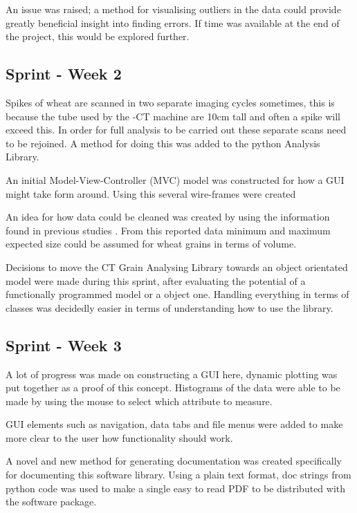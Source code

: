 \documentclass[11pt]{report}
\begin{document}
An issue was raised; a method for visualising outliers in the data could provide greatly beneficial insight into finding errors. If time was available at the end of the project, this would be explored further.

\subsection{Sprint - Week 2}
\label{sec:org50679cf}

Spikes of wheat are scanned in two separate imaging cycles sometimes, this is because the tube used by the \textmu{}-CT machine are 10cm tall and often a spike will exceed this. In order for full analysis to be carried out these separate scans need to be rejoined. A method for doing this was added to the python Analysis Library.

An initial Model-View-Controller (MVC) model was constructed for how a GUI might take form around. Using this several wire-frames were created

An idea for how data could be cleaned was created by using the information found in previous studies \cite{Hughes2017}. From this reported data minimum and maximum expected size could be assumed for wheat grains in terms of volume.

Decisions to move the CT Grain Analysing Library towards an object orientated model were made during this sprint, after evaluating the potential of a functionally programmed model or a object one. Handling everything in terms of classes was decidedly easier in terms of understanding how to use the library.

\subsection{Sprint - Week 3}
\label{sec:orgbc3bae6}

A lot of progress was made on constructing a GUI here, dynamic plotting was put together as a proof of this concept. Histograms of the data were able to be made by using the mouse to select which attribute to measure.

GUI elements such as navigation, data tabs and file menus were added to make more clear to the user how functionality should work.

A novel and new method for generating documentation was created specifically for documenting this software library. Using a plain text format, doc strings from python code was used to make a single easy to read PDF to be distributed with the software package.
\end{document}
